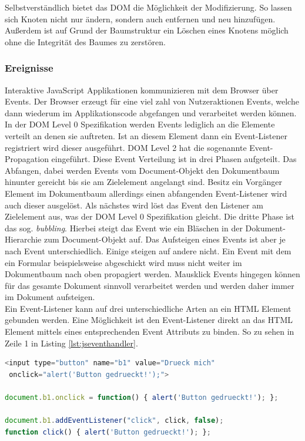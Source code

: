 Selbstverständlich bietet das DOM die Möglichkeit der Modifizierung. So lassen sich Knoten nicht nur ändern, sondern auch entfernen und neu hinzufügen. Außerdem ist auf Grund der Baumstruktur ein Löschen eines Knotens möglich ohne die Integrität des Baumes zu zerstören.

\subsubsection{Ereignisse} Interaktive JavaScript Applikationen kommunizieren mit dem Browser über Events. Der Browser erzeugt für eine viel zahl von Nutzeraktionen Events, welche dann wiederum im Applikationscode abgefangen und verarbeitet werden können. In der DOM Level 0 Spezifikation werden Events lediglich an die Elemente verteilt an denen sie auftreten. Ist an diesem Element dann ein Event-Listener registriert wird dieser ausgeführt. DOM Level 2 hat die sogenannte Event-Propagation eingeführt. Diese Event Verteilung ist in drei Phasen aufgeteilt. Das Abfangen, dabei werden Events vom Document-Objekt den Dokumentbaum hinunter gereicht bis sie am Zielelement angelangt sind. Besitz ein Vorgänger Element im Dokumentbaum allerdings einen abfangenden Event-Listener wird auch dieser ausgelöst. Als nächstes wird löst das Event den Listener am Zielelement aus, was der DOM Level 0 Spezifikation gleicht. Die dritte Phase ist das sog. \textit{bubbling}. Hierbei steigt das Event wie ein Bläschen in der Dokument-Hierarchie zum Document-Objekt auf. Das Aufsteigen eines Events ist aber je nach Event unterschiedlich. Einige steigen auf andere nicht. Ein Event mit dem ein Formular beispielsweise abgeschickt wird muss nicht weiter im Dokumentbaum nach oben propagiert werden. Mausklick Events hingegen können für das gesamte Dokument sinnvoll verarbeitet werden und werden daher immer im Dokument aufsteigen.\\Ein Event-Listener kann auf drei unterschiedliche Arten an ein HTML Element gebunden werden. Eine Möglichkeit ist den Event-Listener direkt an das HTML Element mittels eines entsprechenden Event Attributs zu binden. So zu sehen in Zeile 1 in Listing \ref{lst:jseventhandler}. 

\vspace{1em}
\begin{lstlisting}[language=JavaScript, caption=JavaScript Event-Handler Beispiek, label=lst:jseventhandler]
<input type="button" name="b1" value="Drueck mich"
 onclick="alert('Button gedrueckt!');">

document.b1.onclick = function() { alert('Button gedrueckt!'); };

document.b1.addEventListener("click", click, false);
function click() { alert('Button gedrueckt!'); };
\end{lstlisting}

